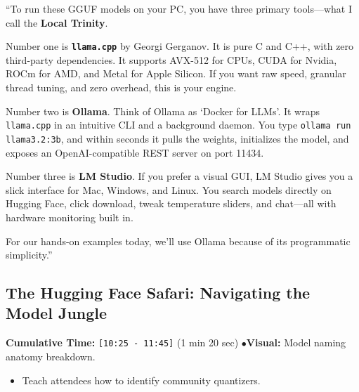 \documentclass[11pt,a4paper]{article}
\begin{document}
\begin{speechbox}
``To run these GGUF models on your PC, you have three primary tools---what I call the \textbf{Local Trinity}.

Number one is \textbf{\texttt{llama.cpp}} by Georgi Gerganov. It is pure C and C++, with zero third-party dependencies. It supports AVX-512 for CPUs, CUDA for Nvidia, ROCm for AMD, and Metal for Apple Silicon. If you want raw speed, granular thread tuning, and zero overhead, this is your engine.

Number two is \textbf{Ollama}. Think of Ollama as `Docker for LLMs'. It wraps \texttt{llama.cpp} in an intuitive CLI and a background daemon. You type \texttt{ollama run llama3.2:3b}, and within seconds it pulls the weights, initializes the model, and exposes an OpenAI-compatible REST server on port 11434.

Number three is \textbf{LM Studio}. If you prefer a visual GUI, LM Studio gives you a slick interface for Mac, Windows, and Linux. You search models directly on Hugging Face, click download, tweak temperature sliders, and chat---all with hardware monitoring built in.

For our hands-on examples today, we'll use Ollama because of its programmatic simplicity.''
\end{speechbox}

\subsection{The Hugging Face Safari: Navigating the Model Jungle}
\begin{directionbox}
    \textbf{Cumulative Time:} \texttt{[10:25 - 11:45]} (1 min 20 sec) \quad$\bullet$\quad \textbf{Visual:} Model naming anatomy breakdown.
    \begin{itemize}
        \item Teach attendees how to identify community quantizers.
    \end{itemize}
\end{directionbox}
\end{document}
